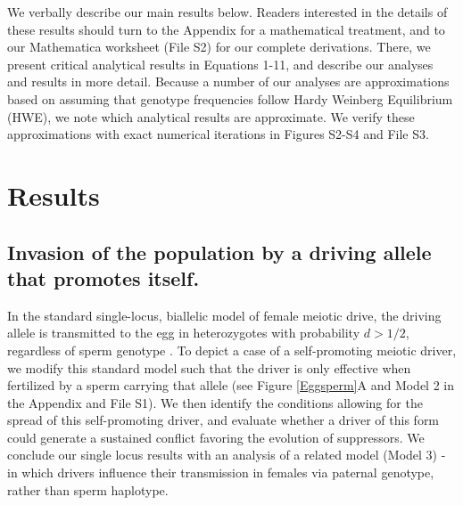 \documentclass[12pt,letterpaper]{article}
\begin{document}
We verbally describe our main results below.  
Readers interested in the details of these results should turn to the Appendix for a mathematical treatment, 
	and to our Mathematica worksheet  (File S2) for our complete derivations. 
There, we present critical analytical results in Equations 1-11, and describe our analyses and results in more detail.  
Because a number of our analyses are approximations based on assuming
that genotype frequencies follow Hardy Weinberg Equilibrium (HWE), we note which analytical results are approximate. 
We verify these approximations with exact numerical iterations in Figures S2-S4 and File S3.


\section*{Results}

\subsection*{Invasion of the population by a driving allele that promotes itself.}

In the standard single-locus, biallelic model of female meiotic drive,
the driving allele is transmitted to the egg in heterozygotes with
probability  $d > 1/2$, regardless of sperm genotype \cite[e.g. ][ and see Model 1 in the Appendix for more details]{Ubeda2004}. 
 To depict a case of a self-promoting meiotic driver,  we modify this standard model such 
	that the driver is only effective when fertilized by a sperm
        carrying that allele (see Figure \ref{Eggsperm}A and Model 2
        in the Appendix and File S1). 
We then identify the conditions allowing for the spread of this self-promoting driver, 
	and evaluate whether a driver of this form could generate a sustained conflict favoring the evolution of suppressors. 
We conclude our single locus results with an analysis of a related model (Model 3) - in which
drivers influence their transmission in females via paternal genotype,
rather than sperm haplotype. \newline 
\end{document}
